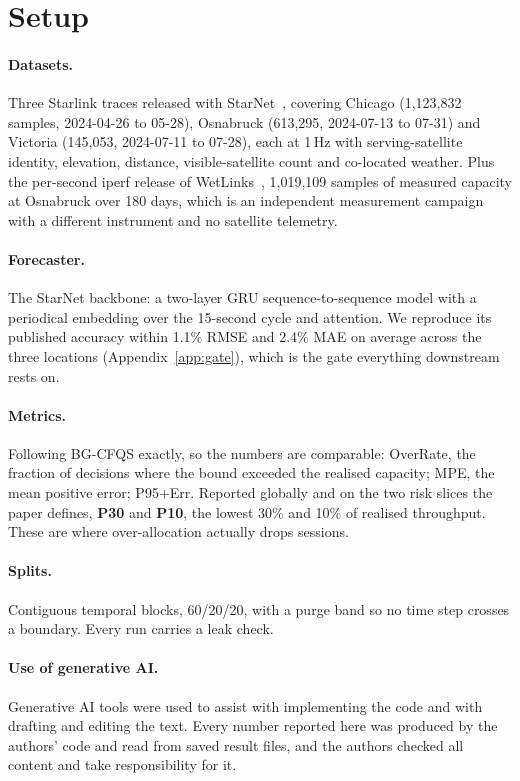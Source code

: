 \documentclass[acmsmall,screen]{acmart}
\begin{document}
\section{Setup}
\label{sec:setup}

\paragraph{Datasets.} Three Starlink traces released with StarNet~\cite{liu2025starnet}, covering Chicago (1,123,832 samples, 2024-04-26 to 05-28), Osnabruck (613,295, 2024-07-13 to 07-31) and Victoria (145,053, 2024-07-11 to 07-28), each at 1\,Hz with serving-satellite identity, elevation, distance, visible-satellite count and co-located weather. Plus the per-second iperf release of WetLinks~\cite{laniewski2024wetlinks}, 1,019,109 samples of measured capacity at Osnabruck over 180 days, which is an independent measurement campaign with a different instrument and no satellite telemetry.

\paragraph{Forecaster.} The StarNet backbone: a two-layer GRU sequence-to-sequence model with a periodical embedding over the 15-second cycle and attention. We reproduce its published accuracy within 1.1\% RMSE and 2.4\% MAE on average across the three locations (Appendix~\ref{app:gate}), which is the gate everything downstream rests on.

\paragraph{Metrics.} Following BG-CFQS exactly, so the numbers are comparable: OverRate, the fraction of decisions where the bound exceeded the realised capacity; MPE, the mean positive error; P95+Err. Reported globally and on the two risk slices the paper defines, \textbf{P30} and \textbf{P10}, the lowest 30\% and 10\% of realised throughput. These are where over-allocation actually drops sessions.

\paragraph{Splits.} Contiguous temporal blocks, 60/20/20, with a purge band so no time step crosses a boundary. Every run carries a leak check.

\paragraph{Use of generative AI.} Generative AI tools were used to assist with implementing the code and with drafting and editing the text. Every number reported here was produced by the authors' code and read from saved result files, and the authors checked all content and take responsibility for it.
\end{document}
